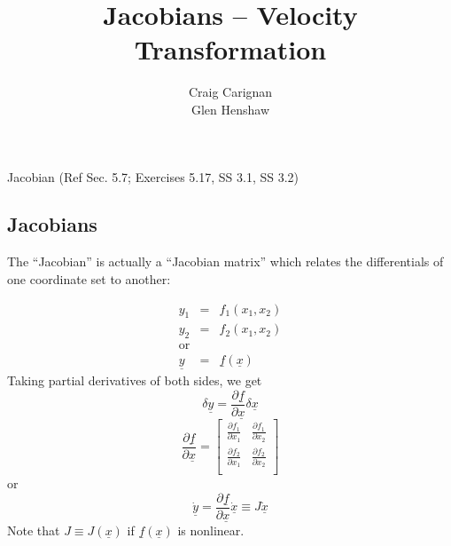 \documentclass[]{article}
\title{Jacobians -- Velocity Transformation}
\author{Craig Carignan\\Glen Henshaw}
\begin{document}
\maketitle

\begin{abstract}

\end{abstract}

Jacobian (Ref Sec. 5.7; Exercises 5.17, SS 3.1, SS 3.2)

\subsection{Jacobians}
The ``Jacobian'' is actually a ``Jacobian matrix'' which relates the differentials of one coordinate set to another:

\begin{eqnarray}
y_{1} & = & f_{1}(x_{1}, x_{2}) \\
y_{2} & = & f_{2}(x_{1}, x_{2}) \\
\textrm{or}\nonumber \\ 
\underline{y} & = & \underline{f}(\underline{x}) 
\end{eqnarray}
Taking partial derivatives of both sides, we get
\begin{displaymath}
	\delta \underline{y} = \frac{\partial \underline{f}}{\partial \underline{x}}\delta\underline{x}
\end{displaymath}
\begin{displaymath}
\frac{\partial \underline{f}}{\partial \underline{x}} = \left[
	\begin{array}{cc}
		\frac{\partial f_{1}}{\partial x_{1}} & \frac{\partial f_{1}}{\partial x_{2}} \\
		\frac{\partial f_{2}}{\partial x_{1}} & \frac{\partial f_{2}}{\partial x_{2}} \\
	\end{array}
	\right]
\end{displaymath}
or
\begin{equation}
	\dot{\underline{y}} = \frac{\partial \underline{f}}{\partial \underline{x}} \dot{\underline{x}} \equiv J\dot{\underline{x}}
\end{equation}
Note that $J \equiv J(\underline{x})$ if $\underline{f}(\underline{x})$ is nonlinear.
\end{document}
